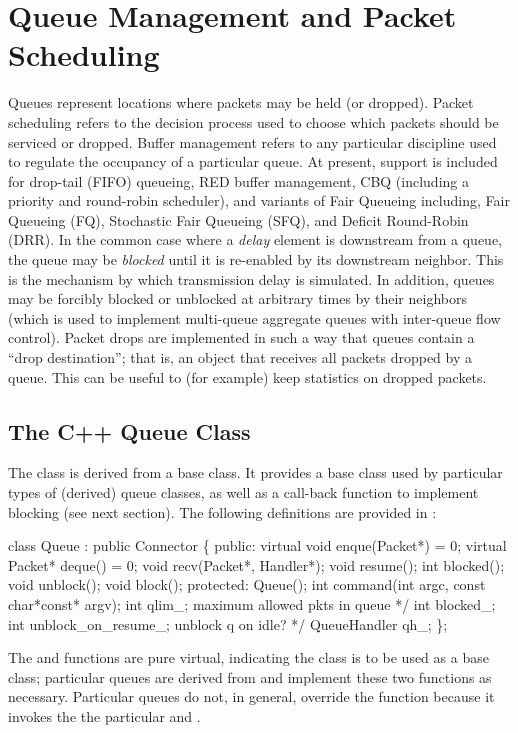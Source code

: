 %
%
\chapter{Queue Management and Packet Scheduling}
\label{chap:qmgmt}

Queues represent locations where packets may be held (or dropped).
Packet scheduling refers to the decision process used to choose
which packets should be serviced or dropped.
Buffer management refers to any particular discipline used
to regulate the occupancy of a particular queue.
At present, support is included for drop-tail (FIFO) queueing,
RED buffer management, CBQ (including a priority and round-robin scheduler), 
and
variants of Fair Queueing including, Fair Queueing (FQ),
Stochastic Fair Queueing (SFQ), and Deficit Round-Robin (DRR).
In the common case where a {\em delay} element is downstream from
a queue, the queue may be {\em blocked} until it is re-enabled
by its downstream neighbor.
This is the mechanism by which transmission delay is simulated.
In addition, queues may be forcibly blocked or unblocked at arbitrary
times by their neighbors (which is used to implement multi-queue
aggregate queues with inter-queue flow control).
Packet drops are implemented in such a way that queues contain
a ``drop destination''; that is, an object that receives all packets
dropped by a queue.
This can be useful to (for example) keep statistics on dropped packets.

\section{The C++ Queue Class}
\label{sec:qclass}

The  class is derived from a  base class.
It provides a base class used by particular types of (derived) queue classes,
as well as a call-back function to implement blocking (see next section).
The following definitions are provided in :
\begin{program}
        class Queue : public Connector \{
         public:
                virtual void enque(Packet*) = 0;
                virtual Packet* deque() = 0;
                void recv(Packet*, Handler*);
                void resume();
                int blocked();
                void unblock();
                void block();
         protected:
                Queue();
                int command(int argc, const char*const* argv);
                int qlim_;         \* maximum allowed pkts in queue */
                int blocked_;
                int unblock_on_resume_; \* unblock q on idle? */
                QueueHandler qh_;
        \};
\end{program}
The  and  functions are pure virtual, indicating
the  class is to be used as a base class;
particular queues are derived
from  and implement these two functions as necessary.
Particular queues do not, in general, override the  function
because it invokes the
the particular  and .

